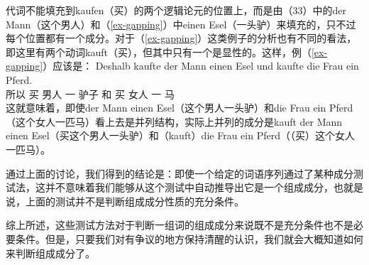 \eal
{}
\zl
代词不能填充到kaufen（买）的两个逻辑论元的位置上，而是由（33）中的der Mann（这个男人）和（\ref{ex-gapping}）中einen Esel（一头驴）来填充的，只不过每个位置都有一个成分。对于（\ref{ex-gapping}）这类例子的分析也有不同的看法，即这里有两个动词kauft（买），但其中只有一个是显性的\citep{Crysmann2003c}。这样，例（\ref{ex-gapping}）应该是：
\ea
\gll Deshalb kaufte der Mann einen Esel und kaufte die Frau ein Pferd.\\
	所以 买  男人 一 驴子 和 买  女人 一 马\\
\z
这就意味着，即使der Mann einen Esel（这个男人一头驴）和die Frau ein Pferd（这个女人一匹马）看上去是并列结构，实际上并列的成分是kauft der Mann einen Esel（买这个男人一头驴）和（kauft）die Frau ein Pferd（（买）这个女人一匹马）。

通过上面的讨论，我们得到的结论是：即使一个给定的词语序列通过了某种成分测试法，这并不意味着我们能够从这个测试中自动推导出它是一个组成成分，也就是说，上面的测试并不是判断组成成分性质的充分条件。

综上所述，这些测试方法对于判断一组词的组成成分来说既不是充分条件也不是必要条件。但是，只要我们对有争议的地方保持清醒的认识，我们就会大概知道如何来判断组成成分了。


